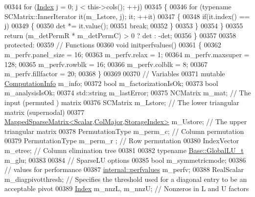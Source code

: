 \begin{DoxyCode}
00344       \textcolor{keywordflow}{for} (\hyperlink{namespace_eigen_a62e77e0933482dafde8fe197d9a2cfde}{Index} j = 0; j < this->cols(); ++j)
00345       \{
00346         \textcolor{keywordflow}{for} (\textcolor{keyword}{typename} SCMatrix::InnerIterator it(m\_Lstore, j); it; ++it)
00347         \{
00348           \textcolor{keywordflow}{if}(it.index() == j)
00349           \{
00350             det *= it.value();
00351             \textcolor{keywordflow}{break};
00352           \}
00353         \}
00354       \}
00355       \textcolor{keywordflow}{return} (m\_detPermR * m\_detPermC) > 0 ? det : -det;
00356     \}
00357 
00358   \textcolor{keyword}{protected}:
00359     \textcolor{comment}{// Functions }
00360     \textcolor{keywordtype}{void} initperfvalues()
00361     \{
00362       m\_perfv.panel\_size = 16;
00363       m\_perfv.relax = 1; 
00364       m\_perfv.maxsuper = 128; 
00365       m\_perfv.rowblk = 16; 
00366       m\_perfv.colblk = 8; 
00367       m\_perfv.fillfactor = 20;  
00368     \}
00369       
00370     \textcolor{comment}{// Variables }
00371     \textcolor{keyword}{mutable} \hyperlink{group__enums_ga85fad7b87587764e5cf6b513a9e0ee5e}{ComputationInfo} m\_info;
00372     \textcolor{keywordtype}{bool} m\_factorizationIsOk;
00373     \textcolor{keywordtype}{bool} m\_analysisIsOk;
00374     std::string m\_lastError;
00375     NCMatrix m\_mat; \textcolor{comment}{// The input (permuted ) matrix }
00376     SCMatrix m\_Lstore; \textcolor{comment}{// The lower triangular matrix (supernodal)}
00377     \hyperlink{class_eigen_1_1_mapped_sparse_matrix}{MappedSparseMatrix<Scalar,ColMajor,StorageIndex>} 
      m\_Ustore; \textcolor{comment}{// The upper triangular matrix}
00378     PermutationType m\_perm\_c; \textcolor{comment}{// Column permutation }
00379     PermutationType m\_perm\_r ; \textcolor{comment}{// Row permutation}
00380     IndexVector m\_etree; \textcolor{comment}{// Column elimination tree }
00381     
00382     \textcolor{keyword}{typename} \hyperlink{struct_eigen_1_1internal_1_1_l_u___global_l_u__t}{Base::GlobalLU\_t} m\_glu; 
00383                                
00384     \textcolor{comment}{// SparseLU options }
00385     \textcolor{keywordtype}{bool} m\_symmetricmode;
00386     \textcolor{comment}{// values for performance }
00387     \hyperlink{struct_eigen_1_1internal_1_1perfvalues}{internal::perfvalues} m\_perfv;
00388     RealScalar m\_diagpivotthresh; \textcolor{comment}{// Specifies the threshold used for a diagonal entry to be an acceptable
       pivot}
00389     \hyperlink{namespace_eigen_a62e77e0933482dafde8fe197d9a2cfde}{Index} m\_nnzL, m\_nnzU; \textcolor{comment}{// Nonzeros in L and U factors}

\end{DoxyCode}
